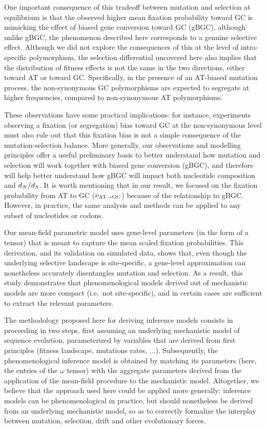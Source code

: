 \documentclass{article}
\begin{document}
One important consequence of this tradeoff between mutation and selection at equilibrium is that the observed higher mean fixation probability toward GC is mimicking the effect of biased gene conversion toward GC ({gBGC}), although unlike {gBGC}, the phenomenon described here corresponds to a genuine selective effect.
Although we did not explore the consequences of this at the level of intra-specific polymorphism, the selection differential uncovered here also implies that the distribution of fitness effects is not the same in the two directions, either toward AT or toward GC.
Specifically, in the presence of an AT-biased mutation process, the {non-synonymous} GC polymorphisms are expected to segregate at higher frequencies, compared to {non-synonymous} AT polymorphisms.

These observations have some practical implications: for instance, experiments observing a fixation (or segregation) bias toward GC at the {non-synonymous} level must also rule out that this fixation bias is not a simple consequence of the mutation-selection balance.
More generally, our observations and modelling principles offer a useful preliminary basis to better understand how mutation and selection will work together with biased gene conversion ({gBGC}), and therefore will help better understand how {gBGC} will impact both nucleotide composition and $d_N / d_S$.
It is worth mentioning that in our result, we focused on the fixation probability from AT to GC ($\nu_{\text{AT} \rightarrow \text{GC}}$) because of the relationship to {gBGC}.
However, in practice, the same analysis and methods can be applied to any subset of nucleotides or codons.

Our mean-field parametric model uses gene-level parameters (in the form of a tensor) that is meant to capture the mean scaled fixation probabilities.
This derivation, and its validation on simulated data, shows that, even though the underlying selective landscape is site-specific, a gene-level approximation can nonetheless accurately disentangles mutation and selection.
As a result, this study demonstrates that phenomenological models derived out of mechanistic models are more compact (i.e.~not site-specific), and in certain cases are sufficient to extract the relevant parameters.

The methodology proposed here for deriving inference models consists in proceeding in two steps, first assuming an underlying mechanistic model of sequence evolution, parameterized by variables that are derived from first principles (fitness landscape, mutations rates, $\hdots$).
Subsequently, the phenomenological inference model is obtained by matching its parameters (here, the entries of the $\omega$ tensor) with the aggregate parameters derived from the application of the mean-field procedure to the mechanistic model.
Altogether, we believe that the approach used here could be applied more generally: inference models can be phenomenological in practice, but should nonetheless be derived from an underlying mechanistic model, so as to correctly formalize the interplay between mutation, selection, drift and other evolutionary forces.
\end{document}
